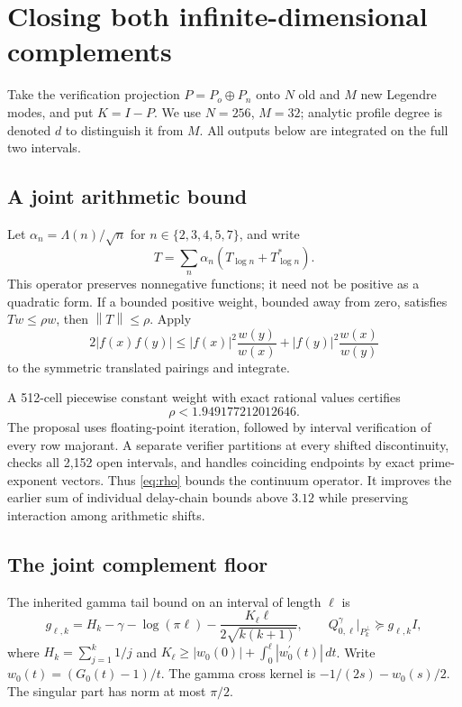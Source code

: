 \documentclass[11pt]{article}
\theoremstyle{remark}\newtheorem{remark}[theorem]{Remark}
\newcommand{\norm}[1]{\left\|#1\right\|}
\begin{document}
\section{Closing both infinite-dimensional complements}\label{sec:complement}

Take the verification projection $P=P_o\oplus P_n$ onto $N$ old and $M$ new Legendre modes, and put $K=I-P$. We use $N=256$, $M=32$; analytic profile degree is denoted $d$ to distinguish it from $M$. All outputs below are integrated on the full two intervals.

\subsection{A joint arithmetic bound}
Let $\alpha_n=\Lambda(n)/\sqrt n$ for $n\in\{2,3,4,5,7\}$, and write
\[
 T=\sum_n\alpha_n(T_{\log n}+T_{\log n}^*).
\]
This operator preserves nonnegative functions; it need not be positive as a quadratic form. If a bounded positive weight, bounded away from zero, satisfies $Tw\le\rho w$, then $\norm T\le\rho$. Apply
\[
 2|f(x)f(y)|\le |f(x)|^2\frac{w(y)}{w(x)}+|f(y)|^2\frac{w(x)}{w(y)}
\]
to the symmetric translated pairings and integrate.

A 512-cell piecewise constant weight with exact rational values certifies
\begin{equation}\label{eq:rho}
 \rho<1.949177212012646.
\end{equation}
The proposal uses floating-point iteration, followed by interval verification of every row majorant. A separate verifier partitions at every shifted discontinuity, checks all 2,152 open intervals, and handles coinciding endpoints by exact prime-exponent vectors. Thus \eqref{eq:rho} bounds the continuum operator. It improves the earlier sum of individual delay-chain bounds above $3.12$ while preserving interaction among arithmetic shifts.

\subsection{The joint complement floor}
The inherited gamma tail bound on an interval of length $\ell$ is
\[
 g_{\ell,k}=H_k-\gamma-\log(\pi\ell)
 -\frac{K_\ell\ell}{2\sqrt{k(k+1)}},\qquad
 Q^\gamma_{0,\ell}\big|_{P_k^\perp}\succeq g_{\ell,k}I,
\]
where $H_k=\sum_{j=1}^k1/j$ and $K_\ell\ge |w_0(0)|+\int_0^\ell|w_0^{\prime}(t)|\,dt$. Write $w_0(t)=(G_0(t)-1)/t$. The gamma cross kernel is $-1/(2s)-w_0(s)/2$. The singular part has norm at most $\pi/2$.
\end{document}
